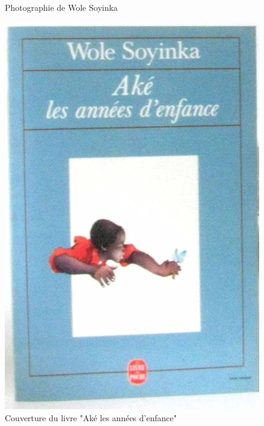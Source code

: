 \documentclass{beamer}
\begin{document}
\begin{frame}
\begin{minipage}[b]{0.3\linewidth}
\begin{figure}
      \caption{Photographie de Wole Soyinka}
      \label{fig1}
    \end{figure}
  \end{minipage}
  \hfill
  \begin{minipage}[b]{0.3\linewidth}
    \begin{figure}
      \centering
      \includegraphics[width=0.9\linewidth]{ressources/ake_les_annees_denfance.png}
      \caption{Couverture du livre "Aké les années d'enfance"}
      \label{fig2}
    \end{figure}
  \end{minipage}

\end{frame}
\end{document}
